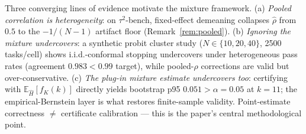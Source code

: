 \documentclass{article}
\theoremstyle{definition}
\theoremstyle{remark}
\newcommand{\E}{\mathbb{E}}
\begin{document}
Three converging lines of evidence motivate the mixture framework.
(a) \emph{Pooled correlation is heterogeneity}: on $\tau^2$-bench, fixed-effect
demeaning collapses $\hat\rho$ from $0.5$ to the $-1/(N{-}1)$ artifact floor
(Remark~\ref{rem:pooled}).
(b) \emph{Ignoring the mixture undercovers}: a synthetic probit cluster study
($N\in\{10,20,40\}$, 2500 tasks/cell) shows i.i.d.-conformal stopping
undercovers under heterogeneous pass rates (agreement $0.983<0.99$ target),
while pooled-$\rho$ corrections are valid but over-conservative.
(c) \emph{The plug-in mixture estimate undercovers too}: certifying with
$\E_{\widehat H}[f_K(k)]$ directly yields bootstrap p95 $0.051>\alpha=0.05$ at
$k=11$; the empirical-Bernstein layer is what restores finite-sample validity.
Point-estimate correctness $\neq$ certificate calibration --- this is the
paper's central methodological point.
\end{document}
